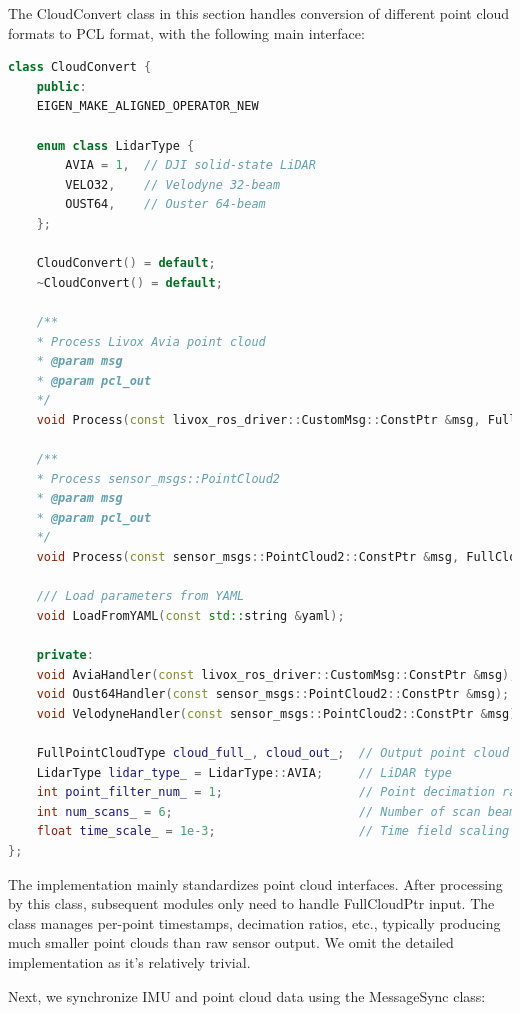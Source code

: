 The CloudConvert class in this section handles conversion of different point cloud formats to PCL format, with the following main interface:

\begin{lstlisting}[language=c++,caption=src/ch7/loosly_coupled_lio/cloud_convert.h]
class CloudConvert {
	public:
	EIGEN_MAKE_ALIGNED_OPERATOR_NEW
	
	enum class LidarType {
		AVIA = 1,  // DJI solid-state LiDAR
		VELO32,    // Velodyne 32-beam
		OUST64,    // Ouster 64-beam
	};
	
	CloudConvert() = default;
	~CloudConvert() = default;
	
	/**
	* Process Livox Avia point cloud
	* @param msg
	* @param pcl_out
	*/
	void Process(const livox_ros_driver::CustomMsg::ConstPtr &msg, FullCloudPtr &pcl_out);
	
	/**
	* Process sensor_msgs::PointCloud2
	* @param msg
	* @param pcl_out
	*/
	void Process(const sensor_msgs::PointCloud2::ConstPtr &msg, FullCloudPtr &pcl_out);
	
	/// Load parameters from YAML
	void LoadFromYAML(const std::string &yaml);
	
	private:
	void AviaHandler(const livox_ros_driver::CustomMsg::ConstPtr &msg);
	void Oust64Handler(const sensor_msgs::PointCloud2::ConstPtr &msg);
	void VelodyneHandler(const sensor_msgs::PointCloud2::ConstPtr &msg);
	
	FullPointCloudType cloud_full_, cloud_out_;  // Output point cloud
	LidarType lidar_type_ = LidarType::AVIA;     // LiDAR type
	int point_filter_num_ = 1;                   // Point decimation ratio
	int num_scans_ = 6;                          // Number of scan beams
	float time_scale_ = 1e-3;                    // Time field scaling factor
};
\end{lstlisting}

The implementation mainly standardizes point cloud interfaces. After processing by this class, subsequent modules only need to handle FullCloudPtr input. The class manages per-point timestamps, decimation ratios, etc., typically producing much smaller point clouds than raw sensor output. We omit the detailed implementation as it's relatively trivial.

Next, we synchronize IMU and point cloud data using the MessageSync class:

